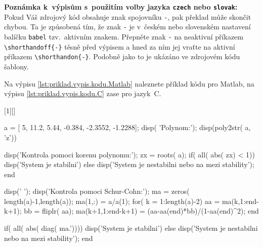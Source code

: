 \vspace{\fill}

\noindent
{\bf Poznámka k~výpisům s~použitím volby jazyka \verb|czech| nebo \verb|slovak|:}\newline
Pokud Váš zdrojový kód obsahuje znak spojovníku \verb|-|, pak překlad může skončit chybou.
Ta je způsobená tím, že znak \verb|-| je v~českém nebo slovenském nastavení balíčku \verb|babel| tzv.\ aktivním znakem.
Přepněte znak \verb|-| na neaktivní příkazem \verb|\shorthandoff{-}| těsně před výpisem a hned za ním jej vraťte na aktivní příkazem \verb|\shorthandon{-}|.
Podobně jako to je ukázáno ve zdrojovém kódu šablony.


\clearpage

Na výpisu \ref{lst:priklad.vypis.kodu.Matlab} naleznete příklad kódu pro Matlab, na výpisu \ref{lst:priklad.vypis.kodu.C} zase pro jazyk~C.

[1][]{%
%
%
\lstset{language=Matlab,numbers=left,#1}%
}{%
%
%
}

\begin{matlab}[frame=single,float=htbp,caption={Příklad Schur-Cohnova testu stability v~prostředí Matlab.},label=lst:priklad.vypis.kodu.Matlab,numberstyle=\scriptsize, numbersep=7pt]

a = [ 5, 11.2, 5.44, -0.384, -2.3552, -1.2288];
disp( 'Polynom:'); disp(poly2str( a, 'z'))

disp('Kontrola pomoci korenu polynomu:');
zx = roots( a);
if( all( abs( zx) < 1))
    disp('System je stabilni')
else
    disp('System je nestabilni nebo na mezi stability');
end

disp(' '); disp('Kontrola pomoci Schur-Cohn:');
ma = zeros( length(a)-1,length(a));
ma(1,:) = a/a(1);
for( k = 1:length(a)-2)
    aa = ma(k,1:end-k+1);
    bb = fliplr( aa);
    ma(k+1,1:end-k+1) = (aa-aa(end)*bb)/(1-aa(end)^2);
end

if( all( abs( diag( ma.'))))
    disp('System je stabilni')
else
    disp('System je nestabilni nebo na mezi stability');
end
\end{matlab}

